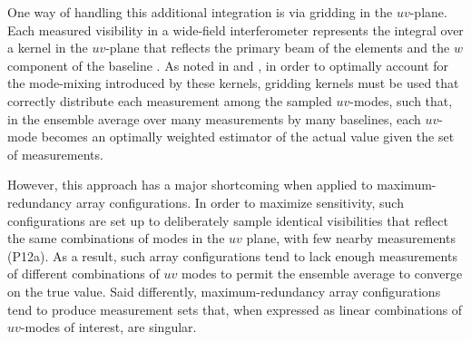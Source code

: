 \documentclass[twocolumn,apj,numberedappendix]{emulateapj}
\begin{document}
One way of handling this additional integration is via gridding in the $uv$-plane.
Each measured visibility in a wide-field interferometer represents the integral over a kernel in
the $uv$-plane that reflects the primary beam of the elements \citep{bhatnagar_et_al2008,morales_matejek2009} and the $w$ component 
of the baseline \citep{cornwell_et_al2003}.  As noted in
\citet{sullivan_et_al2012} and \citet{morales_matejek2009},
in order to optimally account for the mode-mixing introduced by these kernels, gridding kernels must be
used that correctly distribute each measurement among the sampled $uv$-modes, such that, in the ensemble average
over many measurements by many baselines, each $uv$-mode becomes an optimally weighted estimator of the actual
value given the set of measurements.

However, this approach has a major shortcoming when applied to maximum-redundancy array configurations.
In order
to maximize sensitivity, such
configurations are set up to deliberately sample identical visibilities that reflect the same 
combinations of modes in the $uv$ plane, with few nearby measurements (P12a).  As a result,
such array configurations tend to lack enough measurements of different combinations of $uv$ modes
to permit the ensemble average to converge on the true value.  Said differently, maximum-redundancy
array configurations tend to produce measurement sets that, when expressed as linear combinations
of $uv$-modes of interest, are singular.
\end{document}

